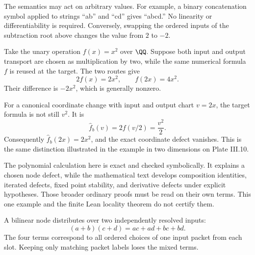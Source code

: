 The semantics may act on arbitrary values. For example, a binary concatenation symbol applied to strings ``ab'' and ``cd'' gives ``abcd.'' No linearity or differentiability is required. Conversely, swapping the ordered inputs of the subtraction root above changes the value from $2$ to $-2$.


Take the unary operation $f(x)=x^2$ over $\QQ$. Suppose both input and output transport are chosen as multiplication by two, while the same numerical formula $f$ is reused at the target. The two routes give
\[
2f(x)=2x^2,\qquad f(2x)=4x^2.
\]
Their difference is $-2x^2$, which is generally nonzero.


For a canonical coordinate change with input and output chart $v=2x$, the target formula is not still $v^2$. It is
\[
\widehat f_b(v)=2f(v/2)=\frac{v^2}{2}.
\]
Consequently $\widehat f_b(2x)=2x^2$, and the exact coordinate defect vanishes. This is the same distinction illustrated in the example in two dimensions on Plate III.10.

The polynomial calculation here is exact and checked symbolically. It explains a chosen node defect, while the mathematical text develops composition identities, iterated defects, fixed point stability, and derivative defects under explicit hypotheses. Those broader ordinary proofs must be read on their own terms. This one example and the finite Lean locality theorem do not certify them.


A bilinear node distributes over two independently resolved inputs:
\[
(a+b)(c+d)=ac+ad+bc+bd.
\]
The four terms correspond to all ordered choices of one input packet from each slot. Keeping only matching packet labels loses the mixed terms.

